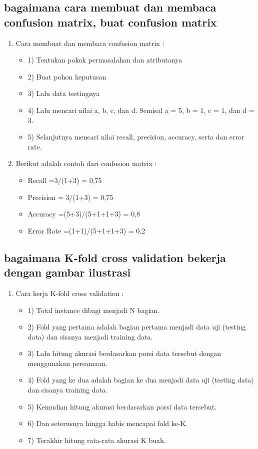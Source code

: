 \subsection{ bagaimana cara membuat dan membaca confusion matrix, buat confusion matrix }
\begin{enumerate}
\item Cara membuat dan membaca confusion matrix :
\begin{itemize}
\item 1)	Tentukan pokok permasalahan dan atributanya
\item 2)	Buat pohon keputusan
\item 3)	Lalu data testingnya
\item 4)	Lalu mencari nilai a, b, c, dan d. Semisal a = 5, b = 1, c = 1, dan d = 3.
\item 5)	Selanjutnya mencari nilai recall, precision, accuracy, serta dan error rate.
\end{itemize}
\item Berikut adalah contoh dari confusion matrix :
\begin{itemize}
\item Recall =3/(1+3) = 0,75
\item Precision = 3/(1+3) = 0,75
\item Accuracy =(5+3)/(5+1+1+3) = 0,8
\item Error Rate =(1+1)/(5+1+1+3) = 0,2
\end{itemize}
\end{enumerate}

\subsection{bagaimana K-fold cross validation bekerja dengan gambar ilustrasi}
\begin{enumerate}
\item Cara kerja K-fold cross validation :
\begin{itemize}
\item 1)	Total instance dibagi menjadi N bagian.
\item 2)	Fold yang pertama adalah bagian pertama menjadi data uji (testing data) dan sisanya menjadi training data.
\item 3)	Lalu hitung akurasi berdasarkan porsi data tersebut dengan menggunakan persamaan.
\item 4)	Fold yang ke dua adalah bagian ke dua menjadi data uji (testing data) dan sisanya training data. 
\item 5)	Kemudian hitung akurasi berdasarkan porsi data tersebut.
\item 6)	Dan seterusnya hingga habis mencapai fold ke-K.
\item 7)	Terakhir hitung rata-rata akurasi K buah.
\end{itemize}
\end{enumerate}

